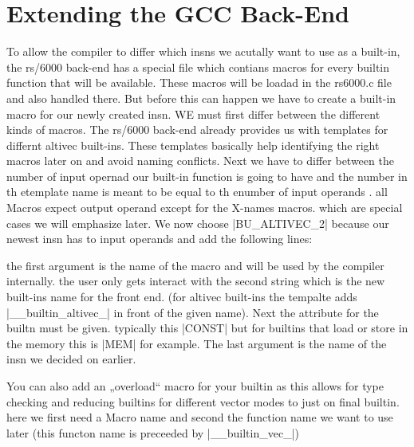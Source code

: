 \chapter{Extending the GCC Back-End}
\label{chapter:extbackend}

To allow the compiler to differ which insns we acutally want to use as a built-in, the rs/6000 back-end has a special file which contians macros for every builtin function that will be available.
These  macros will be loadad in the rs6000.c file and also handled there.
But before this can happen we have to create a built-in macro for our newly created insn.
WE must first differ between the different kinds of macros.
The rs/6000 back-end already provides us with templates for differnt altivec built-ins.
These templates basically help identifying the right macros later on and avoid naming conflicts.
Next we have to differ between the number of input opernad our built-in function is going to have and the number  in th etemplate name is meant to be equal to th enumber of input operands .
all Macros expect output operand except for the X-names macros.
which are special cases we will emphasize later.
We now choose |BU_ALTIVEC_2| because our newest insn has to input operands and add the following lines:

the first argument is the name of the macro and will be used by the compiler internally.
the user only gets interact with the second string which is the new built-ins name for the front end.
(for altivec built-ins the tempalte adds |__builtin_altivec_| in front of the given name).
Next the attribute for the builtn must be given.
typically this |CONST| but for builtins that load or store in the memory this is |MEM| for example.
The last argument is the name of the insn we decided on earlier.

You can also add an „overload“ macro for your builtin as this allows for type checking and reducing builtins for different vector modes to just on final builtin.
here we first need a Macro name and second the function name we want to use later (this functon name is preceeded by |__builtin_vec_|)


